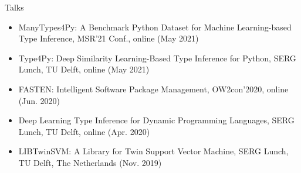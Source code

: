 \documentclass{resume} %
\begin{document}
\begin{rSection}{Talks}
\begin{itemize}
	\item ManyTypes4Py: A Benchmark Python Dataset for Machine Learning-based Type Inference, MSR'21 Conf., online (May 2021)
	\item Type4Py: Deep Similarity Learning-Based Type Inference for Python, SERG Lunch, TU Delft, online (May 2021)
	\item FASTEN: Intelligent Software Package Management, OW2con'2020, online (Jun. 2020)
	\item Deep Learning Type Inference for Dynamic Programming Languages, SERG Lunch, TU Delft, online (Apr. 2020)
	\item LIBTwinSVM: A Library for Twin Support Vector Machine, SERG Lunch, TU Delft, The Netherlands (Nov. 2019)
\end{itemize}
\end{rSection}
\end{document}
